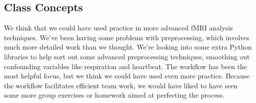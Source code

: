 \documentclass[11pt]{article}
\begin{document}
\subsection{Class Concepts}

We think that we could have used practice in more advanced fMRI analysis
techniques. We've been having some problems with preprocessing, which involves
much more detailed work than we thought. We're looking into some extra Python
libraries to help sort out some advanced preprocessing techniques, smoothing
out confounding variables like respiration and heartbeat. The workflow has been
the most helpful focus, but we think we could have used even more practice.
Because the workflow facilitates efficient team work, we would have liked to
have seen some more group exercises or homework aimed at perfecting the
process.


\end{document}
